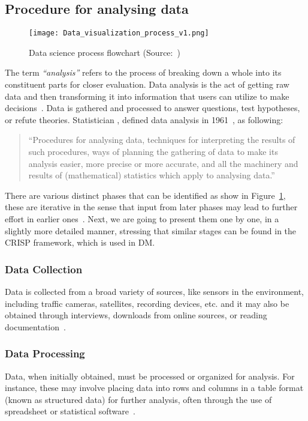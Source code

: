 \subsection{Procedure for analysing data}
\label{subsect:data_analysis_proc}
\begin{figure}[ht]
    \centering
    \texttt{[image: Data\_visualization\_process\_v1.png]}
    \caption{Data science process flowchart (Source:~\cite{Book:doing_data_science})}
    \label{fig:data-science-flowchart}
\end{figure}
The term \textit{``analysis''} refers to the process of breaking down a whole into its constituent parts for closer evaluation.
Data analysis is the act of getting raw data and then transforming it into information that users can utilize to make decisions~\cite{Book:sbrown_2014_transforming}.
Data is gathered and processed to answer questions, test hypotheses, or refute theories.
Statistician \citeauthor{Article:future_of_data_tukey}, defined data analysis in 1961~\cite{Article:future_of_data_tukey}, as following:
\begin{quote}
    ``Procedures for analysing data, techniques for interpreting the results of such procedures, ways of planning the gathering of data to make its analysis easier,
    more precise or more accurate, and all the machinery and results of (mathematical) statistics which apply to analysing data.''
\end{quote}
There are various distinct phases that can be identified as show in Figure~\ref{fig:data-science-flowchart}, these are iterative in the sense that input from later phases may lead to further effort in earlier ones~\cite{Book:doing_data_science}.
Next, we are going to present them one by one, in a slightly more detailed manner, stressing that similar stages can be found in the \ac{CRISP} framework, which is used in \acl{DM}.

\subsubsection{Data Collection}
Data is collected from a broad variety of sources, like sensors in the environment, including traffic cameras, satellites, recording devices, etc. and
it may also be obtained through interviews, downloads from online sources, or reading documentation~\cite{Book:doing_data_science}.

\subsubsection{Data Processing}
Data, when initially obtained, must be processed or organized for analysis.
For instance, these may involve placing data into rows and columns in a table format (known as structured data) for further analysis, often through the use of spreadsheet or statistical software~\cite{Book:doing_data_science}.

